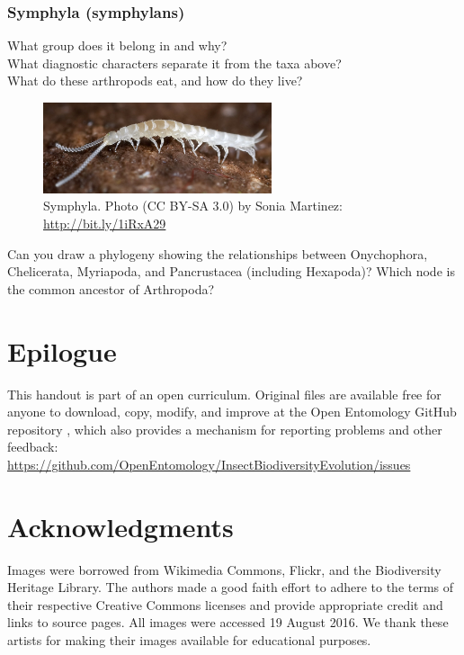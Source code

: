 \documentclass[letterpaper, 11pt]{article}
\begin{document}
\subsubsection*{Symphyla (symphylans)}
What group does it belong in and why?\\

\noindent{}What diagnostic characters separate it from the taxa above?\\

\noindent{}What do these arthropods eat, and how do they live?\\

\begin{figure}[ht!]
  \centering
    \includegraphics[width=0.6\textwidth]{Symphyla}
  \caption{Symphyla. Photo (CC BY-SA 3.0) by Sonia Martinez: \url{http://bit.ly/1iRxA29}}
  \label{fig:symphyla}
\end{figure}

\noindent{}Can you draw a phylogeny showing the relationships between Onychophora, Chelicerata, Myriapoda, and Pancrustacea (including Hexapoda)? Which node is the common ancestor of Arthropoda? \citep[Hint: see][]{Dunlop2013}\\

\section*{Epilogue}
This handout is part of an open curriculum. Original files are available free for anyone to download, copy, modify, and improve at the Open Entomology GitHub repository \citep{ENT432}, which also provides a mechanism for reporting problems and other feedback:\\
\url{https://github.com/OpenEntomology/InsectBiodiversityEvolution/issues}

\section*{Acknowledgments}
Images were borrowed from Wikimedia Commons, Flickr, and the Biodiversity Heritage Library. The authors made a good faith effort to adhere to the terms of their respective Creative Commons licenses and provide appropriate credit and links to source pages. All images were accessed 19 August 2016. We thank these artists for making their images available for educational purposes.


\FloatBarrier


\end{document}
